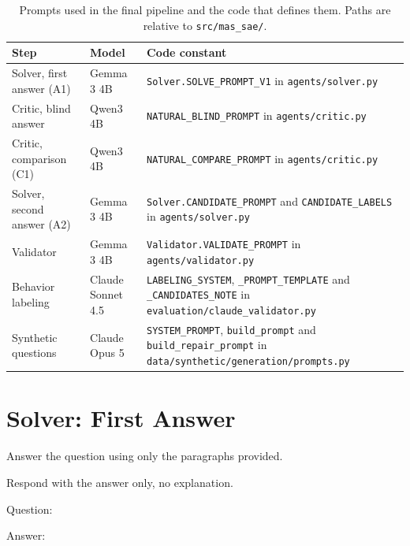 \begin{table}[htbp]
    \centering
    \caption{Prompts used in the final pipeline and the code that defines
    them. Paths are relative to \texttt{src/mas\_sae/}.}
    \label{tab:prompt-sources}
    \small
    \begin{tabular}{p{3.6cm}p{2.8cm}p{8.4cm}}
        \toprule
        Step & Model & Code constant \tabularnewline
        \midrule
        \raggedright Solver, first answer (A1) & Gemma 3 4B
            & \raggedright \texttt{Solver.SOLVE\_PROMPT\_V1} in \texttt{agents/solver.py} \tabularnewline
        \raggedright Critic, blind answer & Qwen3 4B
            & \raggedright \texttt{NATURAL\_BLIND\_PROMPT} in \texttt{agents/critic.py} \tabularnewline
        \raggedright Critic, comparison (C1) & Qwen3 4B
            & \raggedright \texttt{NATURAL\_COMPARE\_PROMPT} in \texttt{agents/critic.py} \tabularnewline
        \raggedright Solver, second answer (A2) & Gemma 3 4B
            & \raggedright \texttt{Solver.CANDIDATE\_PROMPT} and \texttt{CANDIDATE\_LABELS} in \texttt{agents/solver.py} \tabularnewline
        \raggedright Validator & Gemma 3 4B
            & \raggedright \texttt{Validator.VALIDATE\_PROMPT} in \texttt{agents/validator.py} \tabularnewline
        \raggedright Behavior labeling & Claude Sonnet 4.5
            & \raggedright \texttt{LABELING\_SYSTEM}, \texttt{\_PROMPT\_TEMPLATE} and \texttt{\_CANDIDATES\_NOTE} in \texttt{evaluation/claude\_validator.py} \tabularnewline
        \raggedright Synthetic questions & Claude Opus 5
            & \raggedright \texttt{SYSTEM\_PROMPT}, \texttt{build\_prompt} and \texttt{build\_repair\_prompt} in \texttt{data/synthetic/generation/prompts.py} \tabularnewline
        \bottomrule
    \end{tabular}
\end{table}

\section{Solver: First Answer}

\begin{promptbox}
Answer the question using only the paragraphs provided.\par
Respond with the answer only, no explanation.\par
\promptblank
{}\par
\promptblank
Question: \par
Answer:\par
\end{promptbox}

